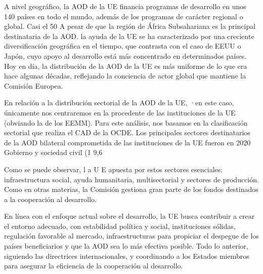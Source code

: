 \documentclass[10pt,a4paper]{article}
\begin{document}
{A nivel geográfico, la AOD de la UE financia programas de desarrollo en unos 140 países en todo el mundo, además de los programas de carácter regional o global. Casi el 50%
A pesar de que la región de África Subsahariana es la principal destinataria de la AOD. la ayuda de la UE se ha caracterizado por una creciente diversificación geográfica en el tiempo, que contrasta con el caso de EEUU o Japón, cuyo apoyo al desarrollo está más concentrado en determinados países. Hoy en día, la distribución de la AOD de la UE es más uniforme de lo que era hace algunas décadas, reflejando la conciencia de actor global que mantiene la Comisión Europea.
}

En relación a la distribución sectorial de la AOD de la UE, ·en este caso, únicamente nos centraremos en la procedente de las instituciones de la UE (obviando la de los EEMM). Para este análisis, nos basamos en la clasificación sectorial que realiza el CAD de la OCDE. Los principales sectores destinatarios de la AOD bilateral comprometida de las instituciones de la UE fueron en 2020 Gobierno y sociedad civil (1 9,6%


Como se puede observar, l a U E apuesta por estos sectores esenciales: infraestructura social, ayuda humanitaria, multisectorial y sectores de producción. Como en otras materias, la Comisión gestiona gran parte de los fondos destinados a la cooperación al desarrollo.

En línea con el enfoque actual sobre el desarrollo, la UE busca contribuir a crear el entorno adecuado, con estabilidad política y social, instituciones sólidas, regulación favorable al mercado, infraestructuras para propiciar el despegue de los países beneficiarios y que la AOD sea lo más efectiva posible. Todo lo anterior, siguiendo las directrices internacionales, y coordinando a los Estados miembros para asegurar la eficiencia de la cooperación al desarrollo.
\end{document}
